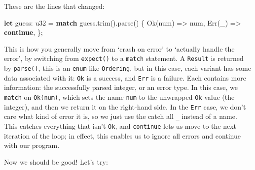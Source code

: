 \documentclass[a4paper,]{book}
\newenvironment{Shaded}{\begin{snugshade}}{\end{snugshade}}
\newcommand{\KeywordTok}[1]{\textcolor[rgb]{0.13,0.29,0.53}{\textbf{{#1}}}}
\newcommand{\DataTypeTok}[1]{\textcolor[rgb]{0.13,0.29,0.53}{{#1}}}
\newcommand{\ConstantTok}[1]{\textcolor[rgb]{0.00,0.00,0.00}{{#1}}}
\newcommand{\NormalTok}[1]{{#1}}
\begin{document}
These are the lines that changed:

\begin{Shaded}
\begin{Highlighting}[]
\KeywordTok{let} \NormalTok{guess: }\DataTypeTok{u32} \NormalTok{= }\KeywordTok{match} \NormalTok{guess.trim().parse() \{}
    \ConstantTok{Ok}\NormalTok{(num) => num,}
    \ConstantTok{Err}\NormalTok{(_) => }\KeywordTok{continue}\NormalTok{,}
\NormalTok{\};}
\end{Highlighting}
\end{Shaded}

This is how you generally move from `crash on error' to `actually handle
the error', by switching from \texttt{expect()} to a \texttt{match}
statement. A \texttt{Result} is returned by \texttt{parse()}, this is an
\texttt{enum} like \texttt{Ordering}, but in this case, each variant has
some data associated with it: \texttt{Ok} is a success, and \texttt{Err}
is a failure. Each contains more information: the successfully parsed
integer, or an error type. In this case, we \texttt{match} on
\texttt{Ok(num)}, which sets the name \texttt{num} to the unwrapped
\texttt{Ok} value (the integer), and then we return it on the right-hand
side. In the \texttt{Err} case, we don't care what kind of error it is,
so we just use the catch all \texttt{\_} instead of a name. This catches
everything that isn't \texttt{Ok}, and \texttt{continue} lets us move to
the next iteration of the loop; in effect, this enables us to ignore all
errors and continue with our program.

Now we should be good! Let's try:

\begin{Shaded}
\end{Shaded}
\end{document}
